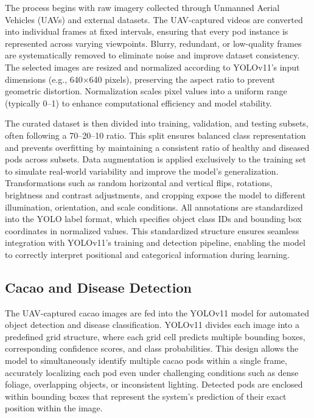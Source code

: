 The process begins with raw imagery collected through Unmanned Aerial Vehicles (UAVs) and external datasets. The UAV-captured videos are converted into individual frames at fixed intervals, ensuring that every pod instance is represented across varying viewpoints. Blurry, redundant, or low-quality frames are systematically removed to eliminate noise and improve dataset consistency. The selected images are resized and normalized according to YOLOv11’s input dimensions (e.g., 640×640 pixels), preserving the aspect ratio to prevent geometric distortion. Normalization scales pixel values into a uniform range (typically 0–1) to enhance computational efficiency and model stability.

The curated dataset is then divided into training, validation, and testing subsets, often following a 70–20–10 ratio. This split ensures balanced class representation and prevents overfitting by maintaining a consistent ratio of healthy and diseased pods across subsets. Data augmentation is applied exclusively to the training set to simulate real-world variability and improve the model’s generalization. Transformations such as random horizontal and vertical flips, rotations, brightness and contrast adjustments, and cropping expose the model to different illumination, orientation, and scale conditions. All annotations are standardized into the YOLO label format, which specifies object class IDs and bounding box coordinates in normalized values. This standardized structure ensures seamless integration with YOLOv11’s training and detection pipeline, enabling the model to correctly interpret positional and categorical information during learning.


\subsection*{Cacao and Disease Detection}

The UAV-captured cacao images are fed into the YOLOv11 model for automated object detection and disease classification. YOLOv11 divides each image into a predefined grid structure, where each grid cell predicts multiple bounding boxes, corresponding confidence scores, and class probabilities. This design allows the model to simultaneously identify multiple cacao pods within a single frame, accurately localizing each pod even under challenging conditions such as dense foliage, overlapping objects, or inconsistent lighting. Detected pods are enclosed within bounding boxes that represent the system’s prediction of their exact position within the image.


